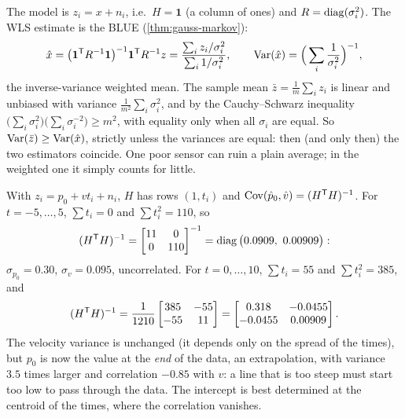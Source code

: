 \begin{solutions}
  \item The model is $z_i = x + n_i$, i.e.\ $H = \mathbf 1$ (a column of ones) and $R = \operatorname{diag}(\sigma_i^2)$. The WLS estimate is the BLUE
        (\cref{thm:gauss-markov}):
        \[
          \hat x = \big(\mathbf 1^{\mathsf{T}} R^{-1}\mathbf 1\big)^{-1}\mathbf 1^{\mathsf{T}} R^{-1} z = \frac{\sum_iz_i/\sigma_i^2}{\sum_i1/\sigma_i^2},
          \qquad \operatorname{Var}(\hat x) = \Big(\sum_i\frac{1}{\sigma_i^2}\Big)^{-1},
        \]
        the inverse-variance weighted mean. The sample mean $\bar z = \frac1m\sum_iz_i$ is linear and unbiased with variance $\frac{1}{m^2}\sum_i\sigma_i^2$, and by the
        Cauchy--Schwarz inequality $\big(\sum_i\sigma_i^2\big)\big(\sum_i\sigma_i^{-2}\big) \ge m^2$, with equality only when all $\sigma_i$ are equal. So
        $\operatorname{Var}(\bar z) \ge \operatorname{Var}(\hat x)$, strictly unless the variances are equal: then (and only then) the two estimators coincide. One poor sensor can
        ruin a plain average; in the weighted one it simply counts for little.

  \item With $z_i = p_0 + vt_i + n_i$, $H$ has rows $(1, t_i)$ and $\operatorname{Cov}(\hat p_0, \hat v) = (H^{\mathsf{T}} H)^{-1}$. For $t = -5, \dots, 5$, $\sum t_i = 0$ and $\sum t_i^2 = 110$, so
        \[
          (H\T H)\inv = \begin{bmatrix}11 & 0\\ 0 & 110\end{bmatrix}\inv = \diag\big(0.0909,\ 0.00909\big):
        \]
        $\sigma_{p_0} = 0.30$, $\sigma_v = 0.095$, uncorrelated. For $t = 0, \dots, 10$, $\sum t_i = 55$ and $\sum t_i^2 = 385$, and
        \[
          (H^{\mathsf{T}} H)^{-1} = \frac{1}{1210}\begin{bmatrix}385 & -55\\ -55 & 11\end{bmatrix} = \begin{bmatrix}0.318 & -0.0455\\ -0.0455 & 0.00909\end{bmatrix}.
        \]
        The velocity variance is unchanged (it depends only on the spread of the times), but $p_0$ is now the value at the \emph{end} of the data,
        an extrapolation, with variance $3.5$ times larger and correlation $-0.85$ with $v$: a line that is too steep must start too low to pass
        through the data. The intercept is best determined at the centroid of the times, where the correlation vanishes.


\end{solutions}
